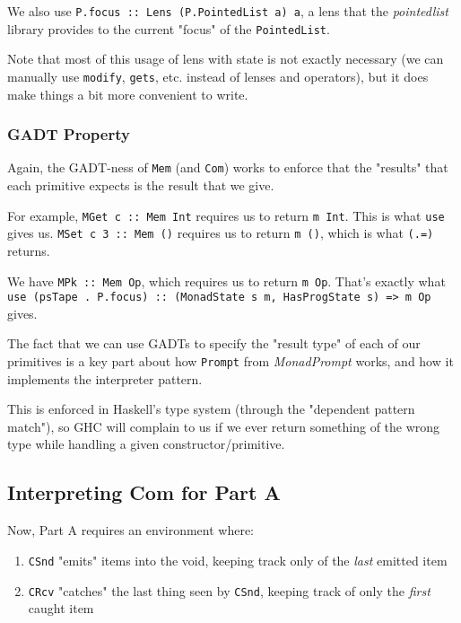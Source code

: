 \documentclass[]{article}
\begin{document}
We also use \texttt{P.focus\ ::\ Lens\textquotesingle{}\ (P.PointedList\ a)\ a},
a lens that the \emph{pointedlist} library provides to the current "focus" of
the \texttt{PointedList}.

Note that most of this usage of lens with state is not exactly necessary (we can
manually use \texttt{modify}, \texttt{gets}, etc. instead of lenses and
operators), but it does make things a bit more convenient to write.

\subsubsection{GADT Property}

Again, the GADT-ness of \texttt{Mem} (and \texttt{Com}) works to enforce that
the "results" that each primitive expects is the result that we give.

For example, \texttt{MGet\ \textquotesingle{}c\textquotesingle{}\ ::\ Mem\ Int}
requires us to return \texttt{m\ Int}. This is what \texttt{use} gives us.
\texttt{MSet\ \textquotesingle{}c\textquotesingle{}\ 3\ ::\ Mem\ ()} requires us
to return \texttt{m\ ()}, which is what \texttt{(.=)} returns.

We have \texttt{MPk\ ::\ Mem\ Op}, which requires us to return \texttt{m\ Op}.
That's exactly what
\texttt{use\ (psTape\ .\ P.focus)\ ::\ (MonadState\ s\ m,\ HasProgState\ s)\ =\textgreater{}\ m\ Op}
gives.

The fact that we can use GADTs to specify the "result type" of each of our
primitives is a key part about how \texttt{Prompt} from \emph{MonadPrompt}
works, and how it implements the interpreter pattern.

This is enforced in Haskell's type system (through the "dependent pattern
match"), so GHC will complain to us if we ever return something of the wrong
type while handling a given constructor/primitive.

\subsection{Interpreting Com for Part A}

Now, Part A requires an environment where:

\begin{enumerate}
\tightlist
\item
  \texttt{CSnd} "emits" items into the void, keeping track only of the
  \emph{last} emitted item
\item
  \texttt{CRcv} "catches" the last thing seen by \texttt{CSnd}, keeping track of
  only the \emph{first} caught item
\end{enumerate}
\end{document}
